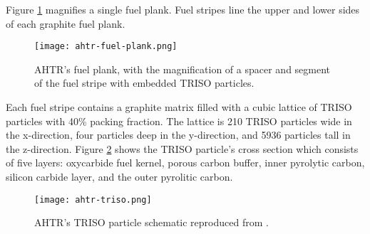 Figure \ref{fig:ahtr-fuel-plank} magnifies a single fuel plank. 
Fuel stripes line the upper and lower sides of each graphite fuel plank. 
\begin{figure}[]
    \centering
    \texttt{[image: ahtr-fuel-plank.png]} 
            \hspace{0.5cm}
    \caption{\acrlong{AHTR}'s fuel plank, with the magnification of 
    a spacer and segment of the fuel stripe with embedded TRISO particles.}
    \label{fig:ahtr-fuel-plank}
\end{figure}
Each fuel stripe contains a graphite matrix filled with a cubic lattice of 
\gls{TRISO} particles with 40\% packing fraction. 
The lattice is 210 \gls{TRISO} particles wide in the x-direction, four particles 
deep in the y-direction, and 5936 particles tall in the z-direction. 
Figure \ref{fig:ahtr-triso} shows the \gls{TRISO} particle's cross section 
which consists of five layers: oxycarbide fuel kernel, porous carbon buffer, 
inner pyrolytic carbon, silicon carbide layer, and the outer pyrolitic carbon. 
\begin{figure}[]
    \centering
    \texttt{[image: ahtr-triso.png]} 
    \caption{\acrlong{AHTR}'s TRISO particle schematic reproduced from 
    \cite{noauthor_fluoride_nodate}.}
    \label{fig:ahtr-triso}
\end{figure}

